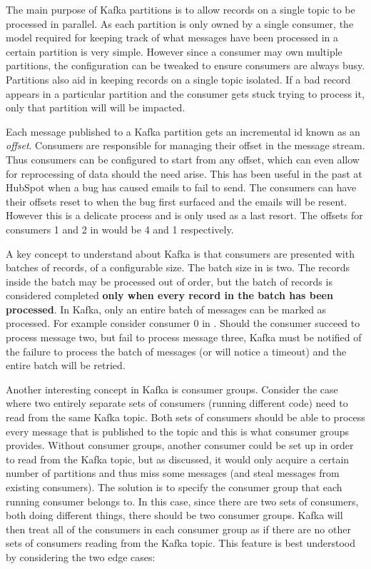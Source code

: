 The main purpose of Kafka partitions is to allow records on a single topic to be processed in parallel. As each partition is only owned by a single consumer, the model required for keeping track of what messages have been processed in a certain partition is very simple. However since a consumer may own multiple partitions, the configuration can be tweaked to ensure consumers are always busy. Partitions also aid in keeping records on a single topic isolated. If a bad record appears in a particular partition and the consumer gets stuck trying to process it, only that partition will will be impacted.

Each message published to a Kafka partition gets an incremental id known as an \textit{offset}. Consumers are responsible for managing their offset in the message stream. Thus consumers can be configured to start from any offset, which can even allow for reprocessing of data should the need arise. This has been useful in the past at HubSpot when a bug has caused emails to fail to send. The consumers can have their offsets reset to when the bug first surfaced and the emails will be resent. However this is a delicate process and is only used as a last resort. The offsets for consumers 1 and 2 in  would be 4 and 1 respectively.

A key concept to understand about Kafka is that consumers are presented with batches of records, of a configurable size. The batch size in  is two. The records inside the batch may be processed out of order, but the batch of records is considered completed \textbf{only when every record in the batch has been processed}. In Kafka, only an entire batch of messages can be marked as processed. For example consider consumer 0 in . Should the consumer succeed to process message two, but fail to process message three, Kafka must be notified of the failure to process the batch of messages (or will notice a timeout) and the entire batch will be retried.


Another interesting concept in Kafka is consumer groups. Consider the case where two entirely separate sets of consumers (running different code) need to read from the same Kafka topic. Both sets of consumers should be able to process every message that is published to the topic and this is what consumer groups provides. Without consumer groups, another consumer could be set up in order to read from the Kafka topic, but as discussed, it would only acquire a certain number of partitions and thus miss some messages (and steal messages from existing consumers). The solution is to specify the consumer group that each running consumer belongs to. In this case, since there are two sets of consumers, both doing different things, there should be two consumer groups. Kafka will then treat all of the consumers in each consumer group as if there are no other sets of consumers reading from the Kafka topic. This feature is best understood by considering the two edge cases:

